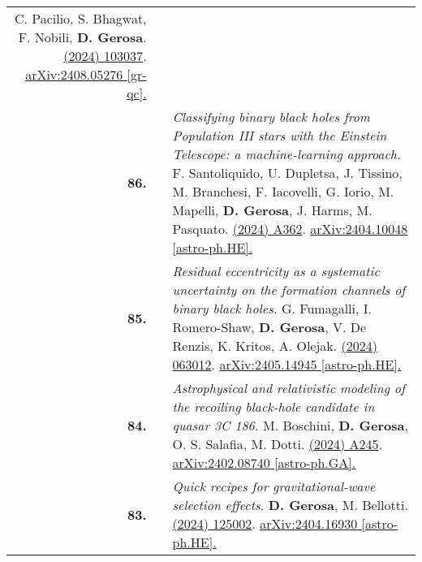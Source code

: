 {\begin{longtable}{rp{0.3cm}p{15.8cm}}
\newline{}
C. Pacilio, S. Bhagwat, F. Nobili, \textbf{D. Gerosa}.
\newline{}
\href{https://journals.aps.org/prd/abstract/10.1103/PhysRevD.110.103037}{\prd 110 (2024) 103037}. \href{https://arxiv.org/abs/2408.05276}{arXiv:2408.05276 [gr-qc].}
\vspace{0.09cm}\\
%
\textbf{86.} & & \textit{Classifying binary black holes from Population III stars with the Einstein Telescope: a machine-learning approach.}
\newline{}
F. Santoliquido, U. Dupletsa, J. Tissino, M. Branchesi, F. Iacovelli, G. Iorio, M. Mapelli, \textbf{D. Gerosa}, J. Harms, M. Pasquato.
\newline{}
\href{https://doi.org/10.1051/0004-6361/202450381}{\aap 690 (2024) A362}. \href{https://arxiv.org/abs/2404.10048}{arXiv:2404.10048 [astro-ph.HE].}
\vspace{0.09cm}\\
%
\textbf{85.} & & \textit{Residual eccentricity as a systematic uncertainty on the formation channels of binary black holes.}
\newline{}
G. Fumagalli, I. Romero-Shaw, \textbf{D. Gerosa}, V. De Renzis, K. Kritos, A. Olejak.
\newline{}
\href{https://journals.aps.org/prd/abstract/10.1103/PhysRevD.110.063012}{\prd 110 (2024) 063012}. \href{https://arxiv.org/abs/2405.14945}{arXiv:2405.14945 [astro-ph.HE].}
\vspace{0.09cm}\\
%
\textbf{84.} & & \textit{Astrophysical and relativistic modeling of the recoiling black-hole candidate in quasar 3C 186.}
\newline{}
M. Boschini, \textbf{D. Gerosa}, O. S. Salafia, M. Dotti.
\newline{}
\href{https://doi.org/10.1051/0004-6361/202449596}{\aap 686 (2024) A245}. \href{https://arxiv.org/abs/2402.08740}{arXiv:2402.08740 [astro-ph.GA].}
\vspace{0.09cm}\\
%
\textbf{83.} & & \textit{Quick recipes for gravitational-wave selection effects.}
\newline{}
\textbf{D. Gerosa}, M. Bellotti.
\newline{}
\href{https://iopscience.iop.org/article/10.1088/1361-6382/ad4509}{\cqg 41 (2024) 125002}. \href{https://arxiv.org/abs/2404.16930}{arXiv:2404.16930 [astro-ph.HE].}
\vspace{0.09cm}\\

\end{longtable}}
